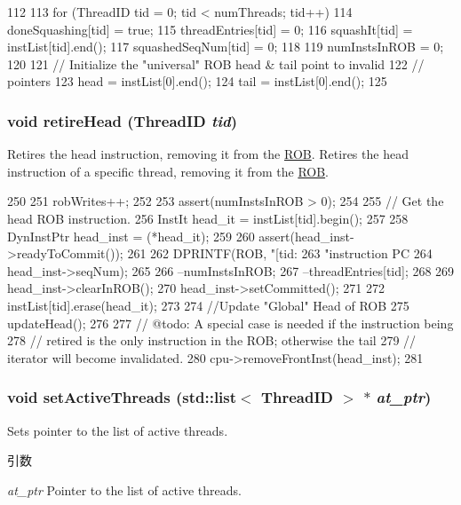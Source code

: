 \begin{DoxyCode}
112 {
113     for (ThreadID tid = 0; tid  < numThreads; tid++) {
114         doneSquashing[tid] = true;
115         threadEntries[tid] = 0;
116         squashIt[tid] = instList[tid].end();
117         squashedSeqNum[tid] = 0;
118     }
119     numInstsInROB = 0;
120 
121     // Initialize the "universal" ROB head & tail point to invalid
122     // pointers
123     head = instList[0].end();
124     tail = instList[0].end();
125 }
\end{DoxyCode}
\hypertarget{classROB_aa14c02115ece83633552be2368b60e67}{
\subsubsection[{retireHead}]{\setlength{\rightskip}{0pt plus 5cm}void retireHead ({\bf ThreadID} {\em tid})}}
\label{classROB_aa14c02115ece83633552be2368b60e67}
Retires the head instruction, removing it from the \hyperlink{classROB}{ROB}. Retires the head instruction of a specific thread, removing it from the \hyperlink{classROB}{ROB}. 


\begin{DoxyCode}
250 {
251     robWrites++;
252 
253     assert(numInstsInROB > 0);
254 
255     // Get the head ROB instruction.
256     InstIt head_it = instList[tid].begin();
257 
258     DynInstPtr head_inst = (*head_it);
259 
260     assert(head_inst->readyToCommit());
261 
262     DPRINTF(ROB, "[tid:%
263             "instruction PC %
264             head_inst->seqNum);
265 
266     --numInstsInROB;
267     --threadEntries[tid];
268 
269     head_inst->clearInROB();
270     head_inst->setCommitted();
271 
272     instList[tid].erase(head_it);
273 
274     //Update "Global" Head of ROB
275     updateHead();
276 
277     // @todo: A special case is needed if the instruction being
278     // retired is the only instruction in the ROB; otherwise the tail
279     // iterator will become invalidated.
280     cpu->removeFrontInst(head_inst);
281 }
\end{DoxyCode}
\hypertarget{classROB_aab96bdacf8bd420402cbb543f994e054}{
\subsubsection[{setActiveThreads}]{\setlength{\rightskip}{0pt plus 5cm}void setActiveThreads ({\bf std::list}$<$ {\bf ThreadID} $>$ $\ast$ {\em at\_\-ptr})}}
\label{classROB_aab96bdacf8bd420402cbb543f994e054}
Sets pointer to the list of active threads. 
\begin{DoxyParams}{引数}
\item[{\em at\_\-ptr}]Pointer to the list of active threads. \end{DoxyParams}



